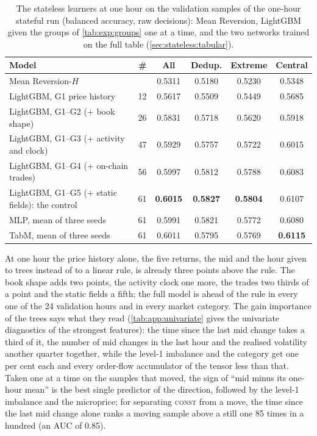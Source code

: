 \begin{table}[t]
\centering
\caption{The stateless learners at one hour on the validation samples of the one-hour
stateful run (balanced accuracy, raw decisions): Mean Reversion, LightGBM given the groups
of \cref{tab:exp:groups} one at a time, and the two networks trained on the full table
(\cref{sec:stateless:tabular}).}
\label{tab:exp:nostate}
\small
\begin{fittable}\begin{tabular}{lrcccc}
\toprule
Model & \# & All & Dedup. & Extreme & Central \\
\midrule
Mean Reversion-$H$                              &    & 0.5311 & 0.5180 & 0.5230 & 0.5348 \\
\midrule
LightGBM, G1 price history                      & 12 & 0.5617 & 0.5509 & 0.5449 & 0.5685 \\
LightGBM, G1--G2 (+ book shape)                 & 26 & 0.5831 & 0.5718 & 0.5620 & 0.5918 \\
LightGBM, G1--G3 (+ activity and clock)         & 47 & 0.5929 & 0.5757 & 0.5722 & 0.6015 \\
LightGBM, G1--G4 (+ on-chain trades)            & 56 & 0.5997 & 0.5812 & 0.5788 & 0.6083 \\
LightGBM, G1--G5 (+ static fields): the control & 61 & \textbf{0.6015} & \textbf{0.5827} & \textbf{0.5804} & 0.6107 \\
\midrule
MLP, mean of three seeds                        & 61 & 0.5991 & 0.5821 & 0.5772 & 0.6080 \\
TabM, mean of three seeds                       & 61 & 0.6011 & 0.5795 & 0.5769 & \textbf{0.6115} \\
\bottomrule
\end{tabular}\end{fittable}
\end{table}

At one hour the price history alone, the five returns, the mid and the hour given to
trees instead of to a linear rule, is already three points above the rule.  The book shape
adds two points, the activity clock one more, the trades two thirds of a point and the
static fields a fifth; the full model is ahead of the rule in every one of the 24
validation hours and in every market category.  The gain importance of the trees says what
they read (\cref{tab:app:univariate} gives the univariate diagnostics of the strongest features): the time since the last mid change takes a third of it, the number of mid changes
in the last hour and the realised volatility another quarter together, while the level-1
imbalance and the category get one per cent each and every order-flow accumulator of the
tensor less than that.  Taken one at a time on the samples that moved, the sign of ``mid
minus its one-hour mean'' is the best single predictor of the direction, followed by the
level-1 imbalance and the microprice; for separating \textsc{const} from a move, the time
since the last mid change alone ranks a moving sample above a still one 85 times in a
hundred (an AUC of 0.85).

